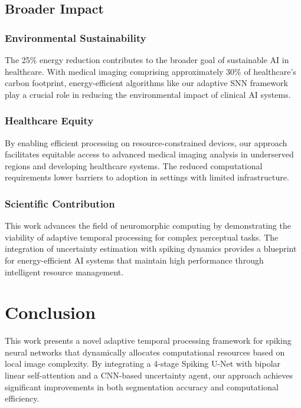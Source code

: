 \documentclass[12pt,a4paper]{article}
\begin{document}
\subsection{Broader Impact}

\subsubsection{Environmental Sustainability}

The 25\% energy reduction contributes to the broader goal of sustainable AI in healthcare. With medical imaging comprising approximately 30\% of healthcare's carbon footprint, energy-efficient algorithms like our adaptive SNN framework play a crucial role in reducing the environmental impact of clinical AI systems.

\subsubsection{Healthcare Equity}

By enabling efficient processing on resource-constrained devices, our approach facilitates equitable access to advanced medical imaging analysis in underserved regions and developing healthcare systems. The reduced computational requirements lower barriers to adoption in settings with limited infrastructure.

\subsubsection{Scientific Contribution}

This work advances the field of neuromorphic computing by demonstrating the viability of adaptive temporal processing for complex perceptual tasks. The integration of uncertainty estimation with spiking dynamics provides a blueprint for energy-efficient AI systems that maintain high performance through intelligent resource management.

\newpage
\section{Conclusion}
\label{sec:conclusion}

This work presents a novel adaptive temporal processing framework for spiking neural networks that dynamically allocates computational resources based on local image complexity. By integrating a 4-stage Spiking U-Net with bipolar linear self-attention and a CNN-based uncertainty agent, our approach achieves significant improvements in both segmentation accuracy and computational efficiency.
\end{document}
